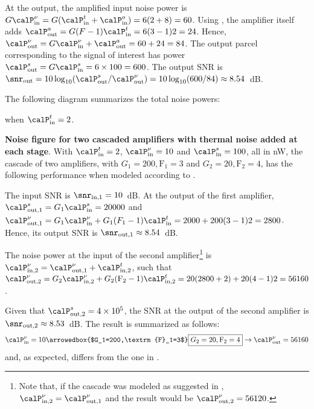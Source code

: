At the output, the amplified input noise power is
$
G \calP_{\textrm{in}}^{\nu} =G(\calP_{\textrm{in}}^{t}+\calP_{\textrm{in}}^{o})=6(2+8)=60
$.
Using , the amplifier itself adds $\calP_{\textrm{out}}^{a} = G (F-1) \calP_{\textrm{in}}^{t} = 6 (3-1) 2 = 24$. Hence, 
$
\calP_{\textrm{out}}^{\nu} = G \calP_{\textrm{in}}^{\nu} + \calP_{\textrm{out}}^{a} = 60 + 24 = 84
$.
The output parcel corresponding to the signal of interest has power
$\calP_{\textrm{out}}^{s} = G \calP_{\textrm{in}}^{s} = 6 \times 100 = 600$. The output SNR is $\snr_{\textrm{out}} = 10 \log_{10} (\calP_{\textrm{out}}^{s} / \calP_{\textrm{out}}^{\nu}) = 10 \log_{10} (600/84) \approx 8.54$~dB.

The following diagram summarizes the total noise powers:

when $\calP_{\textrm{in}}^{t}=2$.
\eExample


\bExample \textbf{Noise figure for two cascaded amplifiers with thermal noise added at each stage}.
\label{ex:cascadeTwoAmplifiers}
With $\calP_{\textrm{in}}^{t}=2$, $\calP_{\textrm{in}}^{\nu}=10$ and $\calP_{\textrm{in}}^{s}=100$, all in nW, the cascade of two amplifiers, with $G_1=200,\textrm{F}_1=3$ and $G_2=20,\textrm{F}_2=4$, has the following performance when modeled according to .

The input SNR is $\snr_{\textrm{in,1}} = 10$~dB.
At the output of the first amplifier, $\calP_{\textrm{out,1}}^{s}= G_1 \calP_{\textrm{in}}^{s} = 20000$ and 
$\calP_{\textrm{out,1}}^{\nu}= G_1 \calP_{\textrm{in}}^{\nu} + G_1 (F_1-1) \calP_{\textrm{in}}^{t} = 2000+200(3-1)2=2800$. Hence, its output SNR is $\snr_{\textrm{out,1}} \approx 8.54$~dB.

The noise power at the input of the second amplifier\footnote{Note that, if the cascade was modeled as suggested in , $\calP_{\textrm{in,2}}^{\nu} = \calP_{\textrm{out,1}}^{\nu}$ and the result would be $\calP_{\textrm{out,2}}^{\nu}=56120$.} is 
$\calP_{\textrm{in,2}}^{\nu} = \calP_{\textrm{out,1}}^{\nu} + \calP_{\textrm{in,2}}^{t}$, such that $\calP_{\textrm{out,2}}^{\nu} = G_2 \calP_{\textrm{in,2}}^{\nu} + G_2(\textrm{F}_2-1) \calP_{\textrm{in,2}}^{t} = 20 (2800+2) + 20(4-1)2 = 56160$. 

Given that $\calP_{\textrm{out,2}}^{s}=4 \times 10^5$, the SNR at the output of the second amplifier is
$\snr_{\textrm{out,2}}\approx 8.53$~dB.
The result is summarized as follows:
\[
\calP_{\textrm{in}}^{\nu}=10 \arrowedbox{$G_1=200,\textrm{F}_1=3$} \fbox{$G_2=20,\textrm{F}_2=4$} \rightarrow \calP_{\textrm{out}}^{\nu}=56160
\]
and, as expected, differs from the one in .
%
\eExample

